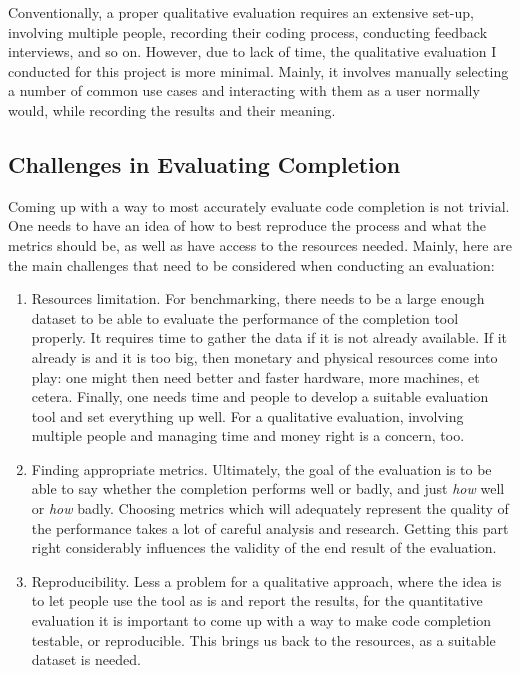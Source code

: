 \documentclass[sigplan,screen]{acmart}
\begin{document}
Conventionally, a proper qualitative evaluation \cite{Kapl05a} requires an extensive set-up, involving multiple people, recording their coding process, conducting feedback interviews, and so on. However, due to lack of time, the qualitative evaluation I conducted for this project is more minimal. Mainly, it involves manually selecting a number of common use cases and interacting with them as a user normally would, while recording the results and their meaning.

\subsection{Challenges in Evaluating Completion}
Coming up with a way to most accurately evaluate code completion is not trivial. One needs to have an idea of how to best reproduce the process and what the metrics should be, as well as have access to the resources needed. Mainly, here are the main challenges that need to be considered when conducting an evaluation:
\begin{enumerate}
    \item Resources limitation. For benchmarking, there needs to be a large enough dataset to be able to evaluate the performance of the completion tool properly. It requires time to gather the data if it is not already available. If it already is and it is too big, then monetary and physical resources come into play: one might then need better and faster hardware, more machines, et cetera. Finally, one needs time and people to develop a suitable evaluation tool and set everything up well. For a qualitative evaluation, involving multiple people and managing time and money right is a concern, too. 
    \item Finding appropriate metrics. Ultimately, the goal of the evaluation is to be able to say whether the completion performs well or badly, and just \textit{how} well or \textit{how} badly. Choosing metrics which will adequately represent the quality of the performance takes a lot of careful analysis and research. Getting this part right considerably influences the validity of the end result of the evaluation.
    \item Reproducibility. Less a problem for a qualitative approach, where the idea is to let people use the tool as is and report the results, for the quantitative evaluation it is important to come up with a way to make code completion testable, or reproducible. This brings us back to the resources, as a suitable dataset is needed.
\end{enumerate}
\end{document}
